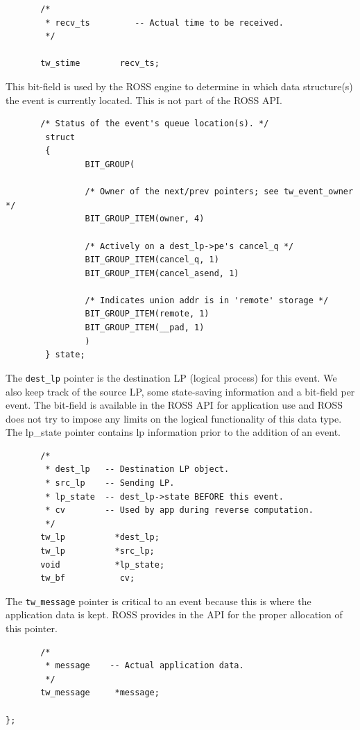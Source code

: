 \documentclass[12pt]{article}
\begin{document}
\begin{verbatim}
       /*
        * recv_ts         -- Actual time to be received.     
        */

       tw_stime        recv_ts;
\end{verbatim}

This bit-field is used by the ROSS engine to determine in which data
structure(s) the event is currently located.  This is not part of the
ROSS API.

\begin{verbatim}
       /* Status of the event's queue location(s). */
        struct
        {
                BIT_GROUP(

                /* Owner of the next/prev pointers; see tw_event_owner */
                BIT_GROUP_ITEM(owner, 4)

                /* Actively on a dest_lp->pe's cancel_q */
                BIT_GROUP_ITEM(cancel_q, 1)
                BIT_GROUP_ITEM(cancel_asend, 1)

                /* Indicates union addr is in 'remote' storage */
                BIT_GROUP_ITEM(remote, 1)
                BIT_GROUP_ITEM(__pad, 1)
                )
        } state;
\end{verbatim}

The {\tt dest\_lp} pointer is the destination LP (logical process) for this
event.  We also keep track of the source LP, some state-saving information and
a bit-field per event.  The bit-field is available in the ROSS API for
application use and ROSS does not try to impose any limits on the logical
functionality of this data type.  The lp\_state pointer contains lp
information prior to the addition of an event.


\begin{verbatim}
       /*
        * dest_lp   -- Destination LP object.
        * src_lp    -- Sending LP.
        * lp_state  -- dest_lp->state BEFORE this event.
        * cv        -- Used by app during reverse computation.
        */
       tw_lp          *dest_lp;
       tw_lp          *src_lp;
       void           *lp_state;
       tw_bf           cv;
\end{verbatim}
 
The {\tt tw\_message} pointer is critical to an event because this is where
the application data is kept.  ROSS provides in the API for the proper
allocation of this pointer.

\begin{verbatim}
       /*
        * message    -- Actual application data.
        */
       tw_message     *message;

};
\end{verbatim}
\end{document}
